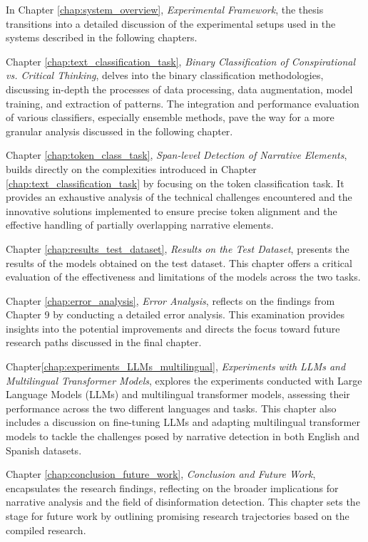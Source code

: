 \documentclass{Configuration_Files/PoliMi3i_thesis}
\begin{document}
In Chapter \ref{chap:system_overview}, \textit{Experimental Framework}, the thesis transitions into a detailed discussion of the experimental setups used in the systems described in the following chapters.

Chapter \ref{chap:text_classification_task}, \textit{Binary Classification of Conspirational vs. Critical Thinking}, delves into the binary classification methodologies, discussing in-depth the processes of data processing, data augmentation, model training, and extraction of patterns. The integration and performance evaluation of various classifiers, especially ensemble methods, pave the way for a more granular analysis discussed in the following chapter.

Chapter \ref{chap:token_class_task}, \textit{Span-level Detection of Narrative Elements}, builds directly on the complexities introduced in Chapter \ref{chap:text_classification_task} by focusing on the token classification task. It provides an exhaustive analysis of the technical challenges encountered and the innovative solutions implemented to ensure precise token alignment and the effective handling of partially overlapping narrative elements.

Chapter \ref{chap:results_test_dataset}, \textit{Results on the Test Dataset}, presents the results of the models obtained on the test dataset. This chapter offers a critical evaluation of the effectiveness and limitations of the models across the two tasks.

Chapter \ref{chap:error_analysis}, \textit{Error Analysis}, reflects on the findings from Chapter 9 by conducting a detailed error analysis. This examination provides insights into the potential improvements and directs the focus toward future research paths discussed in the final chapter.

Chapter\ref{chap:experiments_LLMs_multilingual}, \textit{Experiments with LLMs and Multilingual Transformer Models}, explores the experiments conducted with Large Language Models (LLMs) and multilingual transformer models, assessing their performance across the two different languages and tasks. This chapter also includes a discussion on fine-tuning LLMs and adapting multilingual transformer models to tackle the challenges posed by narrative detection in both English and Spanish datasets.

Chapter \ref{chap:conclusion_future_work}, \textit{Conclusion and Future Work}, encapsulates the research findings, reflecting on the broader implications for narrative analysis and the field of disinformation detection. This chapter sets the stage for future work by outlining promising research trajectories based on the compiled research.
\end{document}
